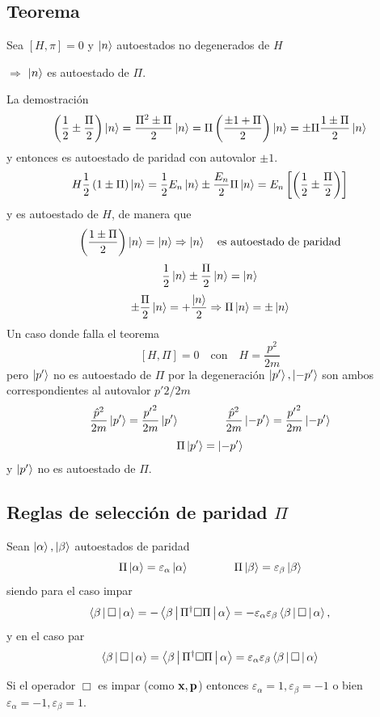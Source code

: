 \documentclass[10pt,oneside]{CBFT_book}
\begin{document}
\subsection{Teorema}

Sea $[H,\pi]=0$ y $\Ket{n}$ autoestados no degenerados de $H$ 

	$\Rightarrow$ $\Ket{n}$ es autoestado de $\Pi$.

La demostración 
\[
	\left(\frac{1}{2}\pm \frac{\Pi}{2}\right)\Ket{n} = \frac{\Pi^2\pm\Pi}{2}\Ket{n} = 
	\Pi \left( \frac{\pm 1+\Pi}{2}\right)\Ket{n} = \pm\Pi \frac{1\pm\Pi}{2}\Ket{n}
\]
y entonces es autoestado de paridad con autovalor $\pm 1$. 
\[
	H\frac{1}{2}\left(1\pm\Pi\right)\Ket{n} = \frac{1}{2}E_n\Ket{n} \pm \frac{E_n}{2}\Pi\Ket{n} =
	E_n\left[ \left( \frac{1}{2} \pm \frac{\Pi}{2}\right) \right]
\]
y es autoestado de $H$, de manera que 
\[
	\left( \frac{1\pm\Pi}{2}\right)\Ket{n} = \Ket{n} \Rightarrow \Ket{n} \quad \text{es autoestado de 
paridad}
\]
\[
	\frac{1}{2}\Ket{n} \pm \frac{\Pi}{2}\Ket{n} = \Ket{n}
\]
\[
	\pm \frac{\Pi}{2}\Ket{n} = +\frac{\Ket{n}}{2} \Rightarrow \Pi\Ket{n} = \pm\Ket{n}
\]
Un caso donde falla el teorema 
\[
	[H,\Pi]=0 \quad \text{con} \quad H=\frac{p^2}{2m} 
\]
pero $\Ket{p'}$ no es autoestado de $\Pi$ por la degeneración $\Ket{p'},\Ket{-p'}$ son ambos correspondientes 
al autovalor $p'2/2m$
\[
	\frac{\hat{p}^2}{2m}\Ket{p'} = \frac{{p'}^2}{2m}\Ket{p'} \qquad  \qquad 
	\frac{\hat{p}^2}{2m}\Ket{-p'} = \frac{{p'}^2}{2m}\Ket{-p'}
\]
\[
	\Pi\Ket{p'}= \Ket{-p'}
\]
y $\Ket{p'}$ no es autoestado de $\Pi$.

\subsection{Reglas de selección de paridad $\Pi$}

Sean $\Ket{\alpha}, \Ket{\beta}$ autoestados de paridad 
\[
	\Pi\Ket{\alpha} = \varepsilon_\alpha \Ket{\alpha} \qquad\qquad
	\Pi\Ket{\beta} = \varepsilon_\beta \Ket{\beta}
\]
siendo para el caso impar
\[
	\Braket{\beta|\Box|\alpha} = - \Braket{\beta|\Pi^\dagger\Box\Pi|\alpha} =
	-\varepsilon_\alpha \varepsilon_\beta \Braket{\beta|\Box|\alpha},
\]
y en el caso par
\[
	\Braket{\beta|\Box|\alpha} = \Braket{\beta|\Pi^\dagger\Box\Pi|\alpha} =
	\varepsilon_\alpha \varepsilon_\beta \Braket{\beta|\Box|\alpha}
\]

Si el operador $\Box$ es impar (como $\vb{x}, \vb{p}$) entonces $\varepsilon_\alpha=1,
\varepsilon_\beta=-1$ o bien $\varepsilon_\alpha=-1,\varepsilon_\beta=1$.
\end{document}
